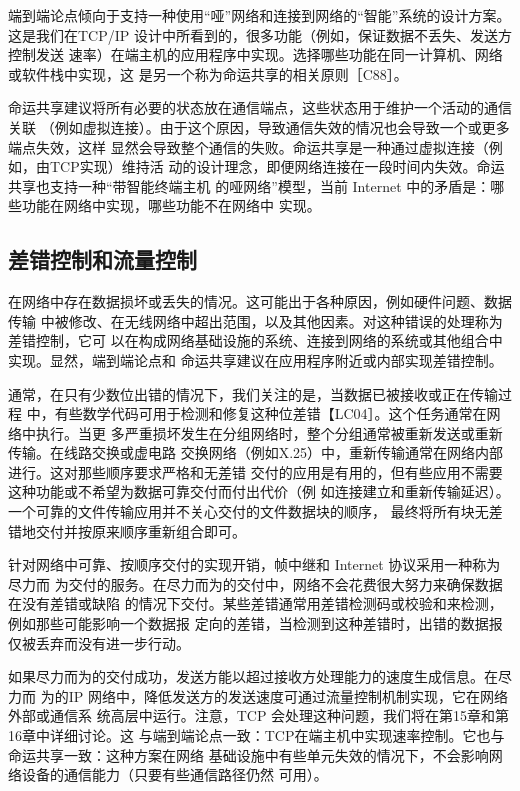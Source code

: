 端到端论点倾向于支持一种使用“哑”网络和连接到网络的“智能”系统的设计方案。
这是我们在TCP/IP 设计中所看到的，很多功能（例如，保证数据不丢失、发送方控制发送
速率）在端主机的应用程序中实现。选择哪些功能在同一计算机、网络或软件栈中实现，这
是另一个称为命运共享的相关原则［C88］。

命运共享建议将所有必要的状态放在通信端点，这些状态用于维护一个活动的通信关联
（例如虚拟连接）。由于这个原因，导致通信失效的情况也会导致一个或更多端点失效，这样
显然会导致整个通信的失败。命运共享是一种通过虚拟连接（例如，由TCP实现）维持活
动的设计理念，即便网络连接在一段时间内失效。命运共享也支持一种“带智能终端主机
的哑网络”模型，当前 Internet 中的矛盾是：哪些功能在网络中实现，哪些功能不在网络中
实现。

\subsection{差错控制和流量控制}

在网络中存在数据损坏或丢失的情况。这可能出于各种原因，例如硬件问题、数据传输
中被修改、在无线网络中超出范围，以及其他因素。对这种错误的处理称为差错控制，它可
以在构成网络基础设施的系统、连接到网络的系统或其他组合中实现。显然，端到端论点和
命运共享建议在应用程序附近或内部实现差错控制。

通常，在只有少数位出错的情况下，我们关注的是，当数据已被接收或正在传输过程
中，有些数学代码可用于检测和修复这种位差错【LC04］。这个任务通常在网络中执行。当更
多严重损坏发生在分组网络时，整个分组通常被重新发送或重新传输。在线路交换或虚电路
交换网络（例如X.25）中，重新传输通常在网络内部进行。这对那些顺序要求严格和无差错
交付的应用是有用的，但有些应用不需要这种功能或不希望为数据可靠交付而付出代价（例
如连接建立和重新传输延迟）。一个可靠的文件传输应用并不关心交付的文件数据块的顺序，
最终将所有块无差错地交付并按原来顺序重新组合即可。

针对网络中可靠、按顺序交付的实现开销，帧中继和 Internet 协议采用一种称为尽力而
为交付的服务。在尽力而为的交付中，网络不会花费很大努力来确保数据在没有差错或缺陷
的情况下交付。某些差错通常用差错检测码或校验和来检测，例如那些可能影响一个数据报
定向的差错，当检测到这种差错时，出错的数据报仅被丢弃而没有进一步行动。

如果尽力而为的交付成功，发送方能以超过接收方处理能力的速度生成信息。在尽力而
为的IP 网络中，降低发送方的发送速度可通过流量控制机制实现，它在网络外部或通信系
统高层中运行。注意，TCP 会处理这种问题，我们将在第15章和第16章中详细讨论。这
与端到端论点一致：TCP在端主机中实现速率控制。它也与命运共享一致：这种方案在网络
基础设施中有些单元失效的情况下，不会影响网络设备的通信能力（只要有些通信路径仍然
可用）。

